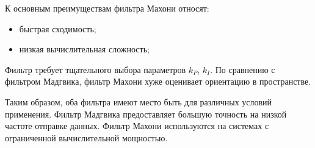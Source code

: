 К основным преимуществам фильтра Махони относят:
\begin{itemize}
	\item быстрая сходимость;
	\item низкая вычислительная сложность;
\end{itemize}

Фильтр требует тщательного выбора параметров \(k_P\), \(k_I\). По сравнению с фильтром Мадгвика, 
фильтр Махони хуже оценивает ориентацию в пространстве.


Таким образом, оба фильтра имеют место быть для различных условий применения.
Фильтр Мадгвика предоставляет большую точность на низкой частоте отправке данных.
Фильтр Махони используются на системах с ограниченной вычислительной мощностью.
